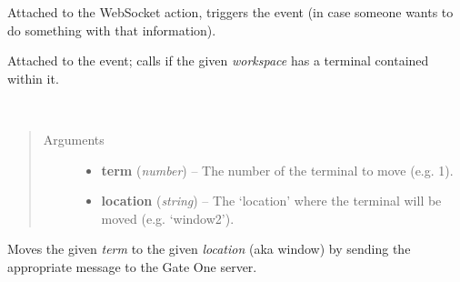 \documentclass[letterpaper,10pt,openany]{sphinxmanual}
\begin{document}
\begin{fulllineitems}
\label{Applications/terminal/js_terminal:GateOne.Terminal.locationsAction}
Attached to the  WebSocket action, triggers the  event (in case someone wants to do something with that information).

\end{fulllineitems}


\begin{fulllineitems}
\label{Applications/terminal/js_terminal:GateOne.Terminal.relocateWorkspaceEvent}
Attached to the  event; calls {\hyperref[Applications/terminal/js_terminal:GateOne.Terminal.relocateTerminal]{}} if the given \emph{workspace} has a terminal contained within it.

\end{fulllineitems}


\begin{fulllineitems}
\label{Applications/terminal/js_terminal:GateOne.Terminal.relocateTerminal}~\begin{quote}\begin{description}
\item[{Arguments}] \leavevmode\begin{itemize}
\item {} 
\textbf{term} (\emph{number}) -- The number of the terminal to move (e.g. 1).

\item {} 
\textbf{location} (\emph{string}) -- The `location' where the terminal will be moved (e.g. `window2').

\end{itemize}

\end{description}\end{quote}

Moves the given \emph{term} to the given \emph{location} (aka window) by sending
the appropriate message to the Gate One server.

\end{fulllineitems}
\end{document}
